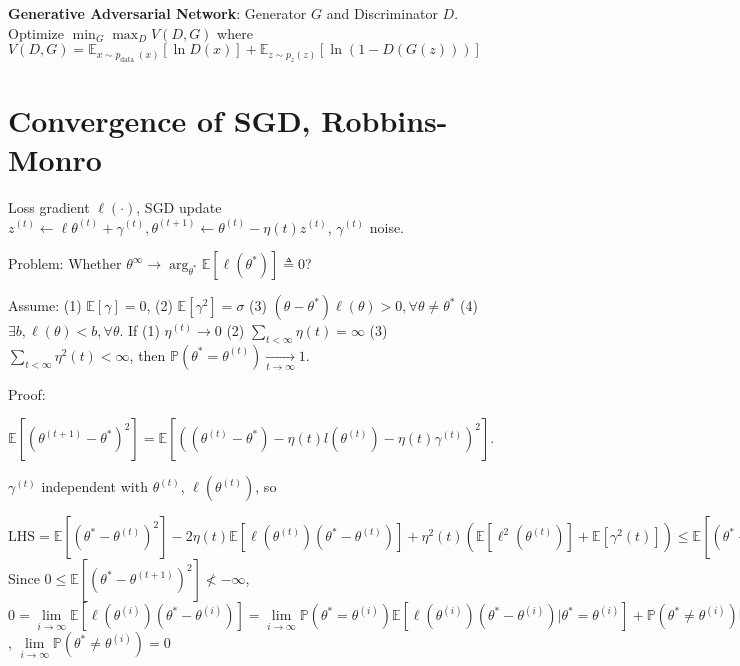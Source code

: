 \textbf{Generative Adversarial Network}: Generator $G$ and Discriminator $D$. Optimize $\min _{G} \max _{D} V(D, G)$ where $V(D, G) = \mathbb{E}_{x \sim p_{\text {data }}(x)}[\ln D(x)]+\mathbb{E}_{z \sim p_{z}(z)}[\ln (1-D(G(z)))]$



\section{Convergence of SGD, Robbins-Monro}
Loss gradient $\ell(\cdot)$, SGD update $z^{(t)} \leftarrow \ell \theta^{(t)}+\gamma^{(t)}, \theta^{(t+1)} \leftarrow \theta^{(t)}-\eta(t) z^{(t)}$, $\gamma^{(t)}$ noise.

Problem: Whether $\theta^{\infty}\to \arg_{\theta^*}\mathbb{E}[\ell (\theta^*)]\triangleq 0$?

Assume: (1) $\mathbb{E}[\gamma] = 0$, (2) $\mathbb{E}[\gamma^2] = \sigma$ (3) $\left(\theta-\theta^{*}\right) \ell(\theta)>0,\forall \theta\neq\theta^*$ (4) $\exists b,\ell(\theta) < b,\forall \theta$. If (1) $\eta^{(t)}\to 0$ (2) $\underset{t<\infty}{\sum} \eta(t)=\infty$ (3) $\underset{t<\infty}{\sum} \eta^{2}(t)<\infty$, then $\mathbb{P}\left(\theta^{*}=\theta^{(t)}\right) \underset{t \rightarrow \infty}{\longrightarrow} 1$.

Proof:
\begin{scriptsize}
    $\mathbb{E}[(\theta^{(t+1)}-\theta^{*})^{2}]=\mathbb{E}[((\theta^{(t)}-\theta^{*})-\eta(t) l(\theta^{(t)})-\eta(t) \gamma^{(t)})^2]$.
\end{scriptsize}
$\gamma^{(t)}$ independent with $\theta^{(t)}$, $\ell(\theta^{(t)})$, so
\begin{scriptsize}
    $\text{LHS}=\mathbb{E}[(\theta^{*}-\theta^{(t)})^{2}]-2 \eta(t) \mathbb{E}[\ell(\theta^{(t)})(\theta^{*}-\theta^{(t)})]+\eta^{2}(t)(\mathbb{E}[\ell^{2}(\theta^{(t)})]+\mathbb{E}[\gamma^{2}(t)]) \leq \mathbb{E}[(\theta^{*}-\theta^{(0)})^{2}]-2\sum_{i\leq t} \eta(i) \mathbb{E}[\ell(\theta^{(i)})(\theta^{*}-\theta^{(i)})]+ \sum_{i \leq t} \eta^{2}(i)\left(b^{2}+\sigma^{2}\right)$
    Since
    $0\leq \mathbb{E}[(\theta^{*}-\theta^{(t+1)})^{2}] \nless-\infty$, $0 =  \underset{i \rightarrow \infty}{\lim} \mathbb{E}[\ell(\theta^{(i)})(\theta^{*}-\theta^{(i)})]= \underset{i \rightarrow \infty}{\lim}\mathbb{P}(\theta^{*}=\theta^{(i)}) \mathbb{E}[\ell(\theta^{(i)})(\theta^{*}-\theta^{(i)}) | \theta^{*}=\theta^{(i)}]+ \mathbb{P}(\theta^{*} \neq \theta^{(i)}) \mathbb{E}[\ell(\theta^{(i)})(\theta^{*}-\theta^{(i)}) | \theta^{*} \neq \theta^{(i)}]$, $\underset{i \rightarrow \infty}{\lim} \mathbb{P}\left(\theta^{*} \neq \theta^{(i)}\right)=0$
\end{scriptsize}

